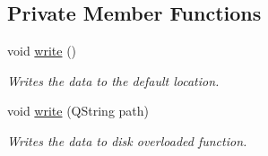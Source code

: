 \subsection*{Private Member Functions}
\begin{DoxyCompactItemize}
\item 
void \hyperlink{a00005_a6fd62e117414acda4fe6a93c453dfb93}{write} ()
\begin{DoxyCompactList}\small\item\em Writes the data to the default location. \end{DoxyCompactList}\item 
void \hyperlink{a00005_aa1362f75c2c485c0094c564256182641}{write} (Q\+String path)
\begin{DoxyCompactList}\small\item\em Writes the data to disk overloaded function. \end{DoxyCompactList}\end{DoxyCompactItemize}
